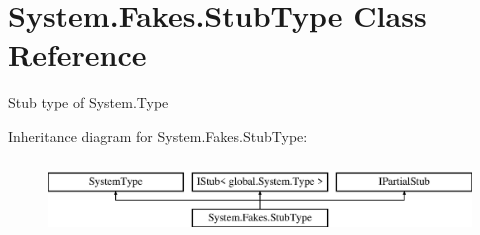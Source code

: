 \hypertarget{class_system_1_1_fakes_1_1_stub_type}{\section{System.\-Fakes.\-Stub\-Type Class Reference}
\label{class_system_1_1_fakes_1_1_stub_type}
}


Stub type of System.\-Type 


Inheritance diagram for System.\-Fakes.\-Stub\-Type\-:\begin{figure}[H]
\begin{center}
\leavevmode
\includegraphics[height=2.000000cm]{class_system_1_1_fakes_1_1_stub_type}
\end{center}
\end{figure}
